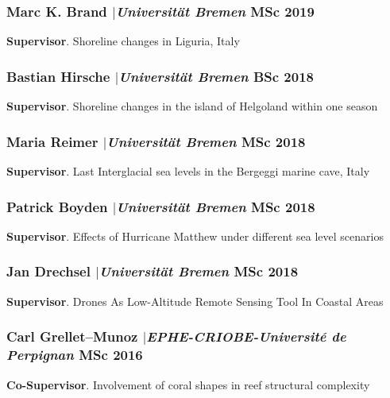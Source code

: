 \documentclass[11pt]{article}
\begin{document}
\smallskip

\subsubsection{Marc K. Brand $|${\normalfont\textit{Universität Bremen}} \hfill MSc 2019}
{\footnotesize 
\textbf{Supervisor}. Shoreline changes in Liguria, Italy}

\smallskip

\subsubsection{Bastian Hirsche $|${\normalfont\textit{Universität Bremen}} \hfill BSc 2018}
{\footnotesize 
\textbf{Supervisor}. Shoreline changes in the island of Helgoland within one season}

\smallskip

\subsubsection{Maria Reimer $|${\normalfont\textit{Universität Bremen}} \hfill MSc 2018}
{\footnotesize 
\textbf{Supervisor}. Last Interglacial sea levels in the Bergeggi marine cave, Italy}

\smallskip

\subsubsection{Patrick Boyden $|${\normalfont\textit{Universität Bremen}} \hfill MSc 2018}
{\footnotesize 
\textbf{Supervisor}. Effects of Hurricane Matthew under different sea level scenarios}

\smallskip

\subsubsection{Jan Drechsel $|${\normalfont\textit{Universität Bremen}} \hfill MSc 2018}
{\footnotesize 
\textbf{Supervisor}. Drones As Low-Altitude Remote Sensing Tool In Coastal Areas}

\smallskip

\subsubsection{Carl Grellet–Munoz $|${\normalfont\textit{EPHE-CRIOBE-Université de Perpignan}} \hfill MSc 2016}
{\footnotesize 
\textbf{Co-Supervisor}. Involvement of coral shapes in reef structural complexity}
\end{document}
